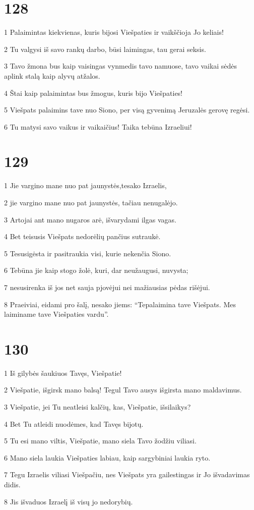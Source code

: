 \chapter{128}


\par 1 Palaimintas kiekvienas, kuris bijosi Viešpaties ir vaikščioja Jo keliais! 
\par 2 Tu valgysi iš savo rankų darbo, būsi laimingas, tau gerai seksis. 
\par 3 Tavo žmona bus kaip vaisingas vynmedis tavo namuose, tavo vaikai sėdės aplink stalą kaip alyvų atžalos. 
\par 4 Štai kaip palaimintas bus žmogus, kuris bijo Viešpaties! 
\par 5 Viešpats palaimins tave nuo Siono, per visą gyvenimą Jeruzalės gerovę regėsi. 
\par 6 Tu matysi savo vaikus ir vaikaičius! Taika tebūna Izraeliui!


\chapter{129}


\par 1 Jie vargino mane nuo pat jaunystės,­tesako Izraelis,­ 
\par 2 jie vargino mane nuo pat jaunystės, tačiau nenugalėjo. 
\par 3 Artojai ant mano nugaros arė, išvarydami ilgas vagas. 
\par 4 Bet teisusis Viešpats nedorėlių pančius sutraukė. 
\par 5 Tesusigėsta ir pasitraukia visi, kurie nekenčia Siono. 
\par 6 Tebūna jie kaip stogo žolė, kuri, dar neužaugusi, nuvysta; 
\par 7 nesusirenka iš jos net sauja pjovėjui nei mažiausias pėdas rišėjui. 
\par 8 Praeiviai, eidami pro šalį, nesako jiems: “Tepalaimina tave Viešpats. Mes laiminame tave Viešpaties vardu”.


\chapter{130}


\par 1 Iš gilybės šaukiuos Tavęs, Viešpatie! 
\par 2 Viešpatie, išgirsk mano balsą! Tegul Tavo ausys išgirsta mano maldavimus. 
\par 3 Viešpatie, jei Tu neatleisi kalčių, kas, Viešpatie, išsilaikys? 
\par 4 Bet Tu atleidi nuodėmes, kad Tavęs bijotų. 
\par 5 Tu esi mano viltis, Viešpatie, mano siela Tavo žodžiu viliasi. 
\par 6 Mano siela laukia Viešpaties labiau, kaip sargybiniai laukia ryto. 
\par 7 Tegu Izraelis viliasi Viešpačiu, nes Viešpats yra gailestingas ir Jo išvadavimas didis. 
\par 8 Jis išvaduos Izraelį iš visų jo nedorybių.


